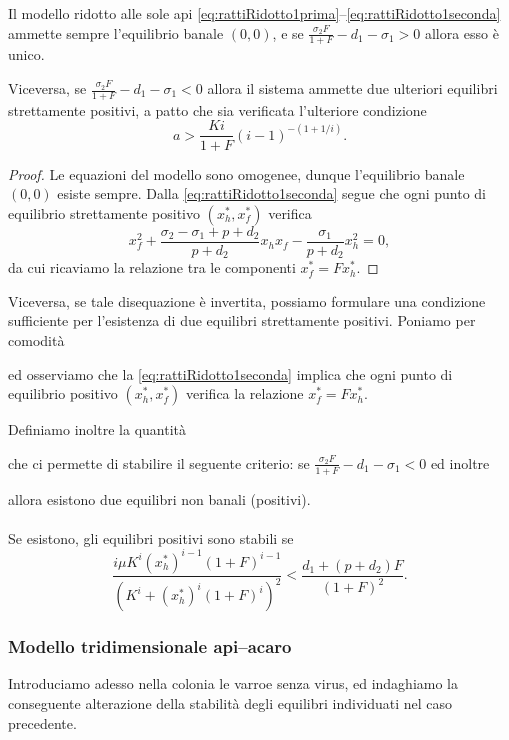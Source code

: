 \begin{proposizione}
    Il modello ridotto alle sole api \eqref{eq:rattiRidotto1prima}--\eqref{eq:rattiRidotto1seconda} ammette sempre l'equilibrio banale $(0,0)$, e se $\frac{\sigma_2 F}{1+F} - d_1 - \sigma_1 >0$ allora esso è unico.

    Viceversa, se $\frac{\sigma_2 F}{1+F} - d_1 - \sigma_1 <0$ allora il sistema ammette due ulteriori equilibri strettamente positivi, a patto che sia verificata l'ulteriore condizione
    $$a > \frac{Ki}{1+F} (i-1)^{- (1+ 1/i)}.$$
\end{proposizione}

\begin{proof}
    Le equazioni del modello sono omogenee, dunque l'equilibrio banale $(0,0)$ esiste sempre.
    Dalla \eqref{eq:rattiRidotto1seconda} segue che ogni punto di equilibrio strettamente positivo $(x_h^*, x_f^*)$ verifica
    $$x_f^2 + \frac{\sigma_2 - \sigma_1 + p + d_2}{p +d_2} x_h x_f - \frac{\sigma_1}{p+d_2} x_h^2 = 0,$$
    da cui ricaviamo la relazione tra le componenti $x_f^* = F x_h^*$.
\end{proof}




Viceversa, se tale disequazione è invertita, possiamo formulare una condizione sufficiente per l'esistenza di due equilibri strettamente positivi.
Poniamo per comodità

ed osserviamo che la \eqref{eq:rattiRidotto1seconda} implica che ogni punto di equilibrio positivo $(x_h^*, x_f^*)$ verifica la relazione $x_f^* = F x_h^*$.

Definiamo inoltre la quantità

che ci permette di stabilire il seguente criterio: se $\frac{\sigma_2 F}{1+F} - d_1 - \sigma_1 <0$ ed inoltre

allora esistono due equilibri non banali (positivi).

\paragraph{}
Se esistono, gli equilibri positivi sono stabili se
\begin{equation}
\frac{i \mu K^i {(x_h^*)}^{i-1} {(1+F)}^{i-1}}{ {\left( K^i + {(x_h^*)}^i {(1+F)}^i \right)}^2 }
<
\frac{d_1 + (p+d_2) F}{{(1+F)}^2}.
\label{eq:rattiRidotto1stability}
\end{equation}

\subsubsection{Modello tridimensionale api--acaro}
Introduciamo adesso nella colonia le varroe senza virus, ed indaghiamo la conseguente alterazione della stabilità degli equilibri individuati nel caso precedente.

